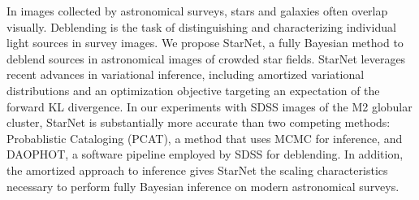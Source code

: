 In images collected by astronomical surveys, stars and galaxies often overlap visually.
Deblending is the task of distinguishing and characterizing individual light sources in survey images.
We propose StarNet, a fully Bayesian method to deblend sources in astronomical images of crowded star fields.
StarNet leverages recent advances in variational inference,
including amortized variational distributions and
an optimization objective targeting an expectation of the forward KL divergence.
In our experiments with SDSS images of the M2 globular cluster, StarNet is substantially more accurate than two competing methods: Probablistic Cataloging (PCAT), a method that uses MCMC for inference, and DAOPHOT, a software pipeline employed by SDSS for deblending.
In addition, the amortized approach to inference 
gives StarNet the scaling characteristics necessary to perform fully Bayesian inference on modern astronomical surveys.

